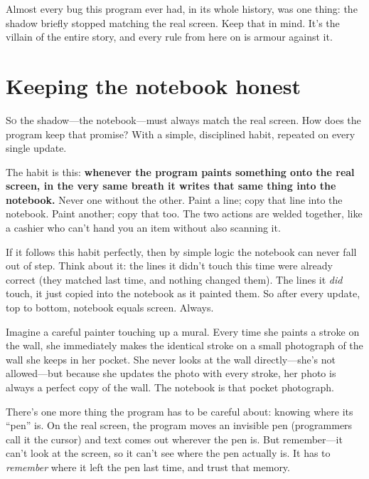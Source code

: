\documentclass[11pt,twoside]{book}
\begin{document}
Almost every bug this program ever had, in its whole history, was one thing:
the shadow briefly stopped matching the real screen. Keep that in mind. It's
the villain of the entire story, and every rule from here on is armour
against it.

\chapter{Keeping the notebook honest}
\lettrine{S}{o} the shadow---the notebook---must always match the real
screen. How does the program keep that promise? With a simple, disciplined
habit, repeated on every single update.

The habit is this: \textbf{whenever the program paints something onto the
real screen, in the very same breath it writes that same thing into the
notebook.} Never one without the other. Paint a line; copy that line into
the notebook. Paint another; copy that too. The two actions are welded
together, like a cashier who can't hand you an item without also scanning it.

If it follows this habit perfectly, then by simple logic the notebook can
never fall out of step. Think about it: the lines it didn't touch this time
were already correct (they matched last time, and nothing changed them). The
lines it \emph{did} touch, it just copied into the notebook as it painted
them. So after every update, top to bottom, notebook equals screen. Always.

\begin{pic}
Imagine a careful painter touching up a mural. Every time she paints a
stroke on the wall, she immediately makes the identical stroke on a small
photograph of the wall she keeps in her pocket. She never looks at the wall
directly---she's not allowed---but because she updates the photo with every
stroke, her photo is always a perfect copy of the wall. The notebook is that
pocket photograph.
\end{pic}

There's one more thing the program has to be careful about: knowing where
its ``pen'' is. On the real screen, the program moves an invisible pen
(programmers call it the cursor) and text comes out wherever the pen is. But
remember---it can't look at the screen, so it can't see where the pen
actually is. It has to \emph{remember} where it left the pen last time, and
trust that memory.
\end{document}
